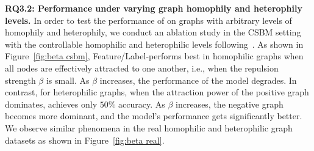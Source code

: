 \textbf{RQ3.2: Performance under varying graph homophily and heterophily levels.}
In order to test the performance of \ours on graphs with arbitrary
levels of homophily and heterophily, we conduct an ablation study in the CSBM setting with the controllable homophilic and heterophilic levels following~\citet{GRP-GNN}.
As shown in Figure~\ref{fig:beta csbm}, Feature/Label-\ours performs best in homophilic graphs when all nodes are effectively attracted to one another, i.e., when the repulsion strength $\beta$ is small. As $\beta$ increases, the performance of the model degrades.
In contrast, for heterophilic graphs, when the attraction power of the positive graph dominates, \ours achieves only $50\%$ accuracy. 
As $\beta$ increases, the negative graph becomes more dominant, and the model's performance gets significantly better. We observe similar phenomena in the real homophilic and heterophilic graph datasets as shown in Figure~\ref{fig:beta real}.

